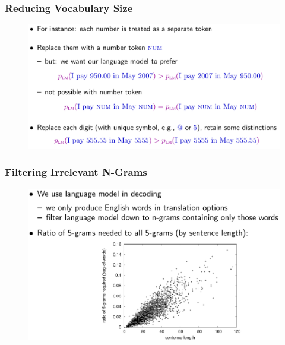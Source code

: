 \documentclass{beamer}
\begin{document}
\begin{frame}\frametitle{Reducing Vocabulary Size}
\begin{figure}
\includegraphics[width=1\linewidth]{figure/vocabulary_size.pdf}
\end{figure}
\end{frame}

\begin{frame}\frametitle{Filtering Irrelevant N-Grams}
\begin{figure}
\includegraphics[width=1\linewidth]{figure/filter_ngram.pdf}
\end{figure}
\end{frame}
\end{document}
